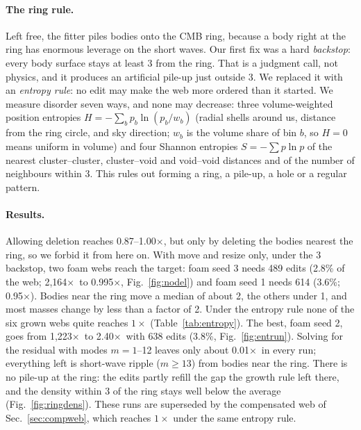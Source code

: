 \documentclass[aps,prd,twocolumn,nofootinbib,superscriptaddress,floatfix]{revtex4-2}
\newcommand{\fl}{\ensuremath{\times}}
\begin{document}
\paragraph*{The ring rule.} Left free, the fitter piles bodies onto the CMB ring, because a body right at the ring has enormous leverage on the short waves. Our first fix was a hard \emph{backstop}: every body surface stays at least \SI{3}{\Gpc} from the ring. That is a judgment call, not physics, and it produces an artificial pile-up just outside \SI{3}{\Gpc}. We replaced it with an \emph{entropy rule}: no edit may make the web more ordered than it started. We measure disorder seven ways, and none may decrease: three volume-weighted position entropies $H=-\sum_b p_b\ln(p_b/w_b)$ (radial shells around us, distance from the ring circle, and sky direction; $w_b$ is the volume share of bin $b$, so $H=0$ means uniform in volume) and four Shannon entropies $S=-\sum p\ln p$ of the nearest cluster--cluster, cluster--void and void--void distances and of the number of neighbours within \SI{3}{\Gpc}. This rules out forming a ring, a pile-up, a hole or a regular pattern.

\paragraph*{Results.} Allowing deletion reaches 0.87--1.00\fl, but only by deleting the bodies nearest the ring, so we forbid it from here on. With move and resize only, under the \SI{3}{\Gpc} backstop, two foam webs reach the target: foam seed 3 needs 489 edits (2.8\% of the web; 2,164\fl\ to 0.995\fl, Fig.~\ref{fig:nodel}) and foam seed 1 needs 614 (3.6\%; 0.95\fl). Bodies near the ring move a median of about \SI{2}{\Gpc}, the others under \SI{1}{\Gpc}, and most masses change by less than a factor of 2. Under the entropy rule none of the six grown webs quite reaches $1\times$ (Table~\ref{tab:entropy}). The best, foam seed 2, goes from 1,223\fl\ to 2.40\fl\ with 638 edits (3.8\%, Fig.~\ref{fig:entrun}). Solving for the residual with modes $m=1$--12 leaves only about 0.01\fl\ in every run; everything left is short-wave ripple ($m\geq13$) from bodies near the ring. There is no pile-up at the ring: the edits partly refill the gap the growth rule left there, and the density within \SI{3}{\Gpc} of the ring stays well below the average (Fig.~\ref{fig:ringdens}). These runs are superseded by the compensated web of Sec.~\ref{sec:compweb}, which reaches $1\times$ under the same entropy rule.
\end{document}
